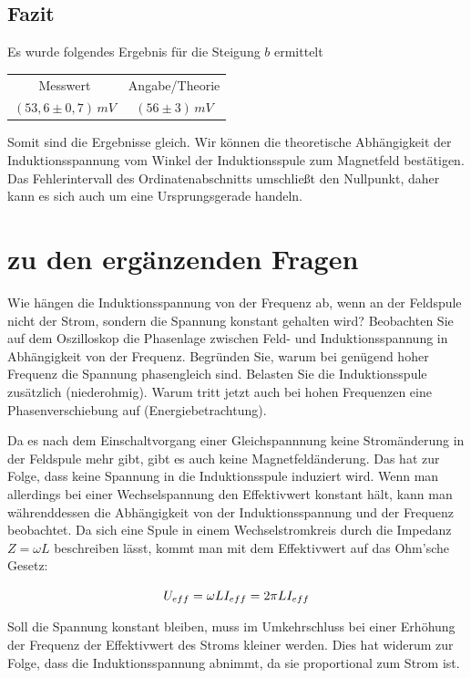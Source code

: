 \documentclass{article}
\begin{document}
\subsection{Fazit}
Es wurde folgendes Ergebnis für die Steigung \(b\) ermittelt
\begin{center}
\begin{tabular}{c c} 
 Messwert & Angabe/Theorie \\
 \( (53,6 \pm 0,7)\, mV \) & \( (56 \pm 3)\, mV \) \\
 \end{tabular}
\end{center}
Somit sind die Ergebnisse gleich. Wir können die theoretische Abhängigkeit der Induktionsspannung vom Winkel der Induktionsspule zum Magnetfeld bestätigen. Das Fehlerintervall des Ordinatenabschnitts umschließt den Nullpunkt, daher kann es sich auch um eine Ursprungsgerade handeln.

\newpage
\section{zu den ergänzenden Fragen}
Wie hängen die Induktionsspannung von der Frequenz ab, wenn an der Feldspule nicht der Strom, sondern die Spannung konstant gehalten wird?
Beobachten Sie auf dem Oszilloskop die Phasenlage zwischen Feld- und Induktionsspannung in Abhängigkeit von der Frequenz.
Begründen Sie, warum bei genügend hoher Frequenz die Spannung phasengleich sind. Belasten Sie die Induktionsspule zusätzlich (niederohmig). Warum tritt jetzt auch bei hohen Frequenzen eine Phasenverschiebung auf (Energiebetrachtung).

\vspace{1cm}

Da es nach dem Einschaltvorgang einer Gleichspannnung keine Stromänderung in der Feldspule mehr gibt, gibt es auch keine Magnetfeldänderung. Das hat zur Folge, dass keine Spannung in die Induktionsspule induziert wird. Wenn man allerdings bei einer Wechselspannung den Effektivwert konstant hält, kann man währenddessen die Abhängigkeit von der Induktionsspannung und der Frequenz beobachtet.
Da sich eine Spule in einem Wechselstromkreis durch die Impedanz $Z=\omega L$ beschreiben lässt, kommt man mit dem Effektivwert auf das Ohm'sche Gesetz:

\begin{equation}
U_{eff}=\omega L I_{eff}=2\pi L I_{eff}
\notag
\end{equation}

Soll die Spannung konstant bleiben, muss im Umkehrschluss bei einer Erhöhung der Frequenz der Effektivwert des Stroms kleiner werden. Dies hat widerum zur Folge, dass die Induktionsspannung abnimmt, da sie proportional zum Strom ist.
\end{document}
